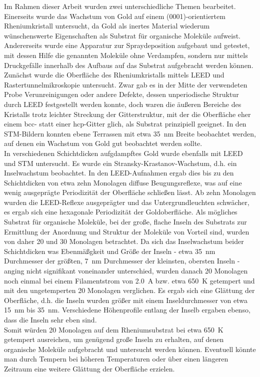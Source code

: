 Im Rahmen dieser Arbeit wurden zwei unterschiedliche Themen bearbeitet. Einerseits wurde das
Wachstum von Gold auf einem (0001)-orientiertem Rheniumkristall untersucht, da Gold als
inertes Material wiederum wünschenswerte Eigenschaften als Substrat für organische Moleküle
aufweist. Andererseits wurde eine Apparatur zur Spraydeposition aufgebaut und getestet, mit
dessen Hilfe die genannten Moleküle ohne Verdampfen, sondern nur mittels Druckgefälle innerhalb
des Aufbaus auf das Substrat aufgebracht werden können.
\\
Zunächst wurde die Oberfläche des Rheniumkristalls mittels LEED und Rastertunnelmikroskopie
untersucht. Zwar gab es in der Mitte der verwendeten Probe Verunreinigungen oder andere Defekte,
dessen unperiodische Struktur durch LEED festgestellt werden konnte, doch waren die äußeren Bereiche
des Kristalls trotz leichter Streckung der Gitterstruktur, mit der die Oberfläche eher einem bcc-
statt einer hcp-Gitter glich, als Substrat prinzipiell geeignet. In den STM-Bildern konnten ebene
Terrassen mit etwa \SI{35}{nm} Breite beobachtet werden, auf denen ein Wachstum von Gold gut
beobachtet werden sollte.
\\
In verschiedenen Schichtdicken aufgdampftes Gold wurde ebenfalls mit LEED und STM untersucht. Es
wurde ein Stransky-Krastanov-Wachstum, d.h. ein Inselwachstum beobachtet. In den LEED-Aufnahmen
ergab dies bis zu den Schichtdicken von etwa zehn Monolagen diffuse Beugungsreflexe, was auf eine
wenig ausgeprägte Periodizität der Oberfläche schließen lässt. Ab zehn Monolagen wurden die
LEED-Reflexe ausgeprägter und das Untergrundleuchten schwächer, es ergab sich eine hexagonale
Periodizität der Goldoberfläche. Als mögliches Substrat für organische Moleküle, bei der große,
flache Inseln des Substrats zur Ermittlung der Anordnung und Struktur der Moleküle von Vorteil sind,
wurden von daher 20 und 30 Monolagen betrachtet. Da sich das Inselwachstum beider Schichtdicken was Ebenmäßgkeit und Größe
der Inseln - etwa \SI{35}{nm} Durchmesser der größten, 
\SI{7}{nm} Durchmesser der kleinsten, obersten Inseln - anging nicht signifikant voneinander
unterschied, wurden danach 20 Monolagen noch einmal bei einem Filamentstrom von
\SI{2,0}{A} bzw. etwa \SI{650}{K} getempert und mit den ungetemperten 20 Monolagen verglichen. Es
ergab sich eine Glättung der Oberfläche, d.h. die Inseln wurden größer mit einem Inseldurchmesser
von etwa \SI{15}{nm} bis \SI{35}{nm}. Verschiedene Höhenprofile entlang der Inselb ergaben ebenso,
dass die Inseln sehr eben sind.
\\
Somit würden 20 Monolagen auf dem Rheniumsubstrat bei etwa \SI{650}{K} getempert ausreichen, um
genügend große Inseln zu erhalten, auf denen organische Moleküle aufgebracht und untersucht werden
können. Eventuell könnte man durch Tempern bei höheren Temperaturen oder über einen längeren
Zeitraum eine weitere Glättung der Oberfläche erzielen.
\\

